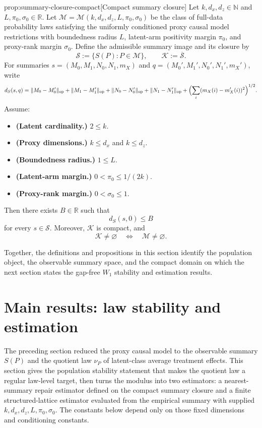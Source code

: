 \documentclass[11pt]{article}
\begin{document}
\begin{propositionv}{prop:summary-closure-compact}[Compact summary closure]
Let \(k,d_x,d_z\in\mathbb N\) and \(L,\pi_0,\sigma_0\in\mathbb R\). Let \(\mathcal M=\mathcal M(k,d_x,d_z,L,\pi_0,\sigma_0)\) be the class of full-data probability laws satisfying the uniformly conditioned proxy causal model restrictions with boundedness radius \(L\), latent-arm positivity margin \(\pi_0\), and proxy-rank margin \(\sigma_0\). Define the admissible summary image and its closure by
\[
\mathscr S:=\{S(P):P\in\mathcal M\},
\qquad
\mathcal K:=\overline{\mathscr S}.
\]
For summaries \(s=(M_0,M_1,N_0,N_1,m_X)\) and \(q=(M_0',M_1',N_0',N_1',m_X')\), write
\[
d_S(s,q)
=
\|M_0-M_0'\|_{\mathrm{op}}
+\|M_1-M_1'\|_{\mathrm{op}}
+\|N_0-N_0'\|_{\mathrm{op}}
+\|N_1-N_1'\|_{\mathrm{op}}
+\Bigl(\sum_i (m_X(i)-m_X'(i))^2\Bigr)^{1/2}.
\]
Assume:
\begin{itemize}
\item \textbf{(Latent cardinality.)} \(2\le k\).
\item \textbf{(Proxy dimensions.)} \(k\le d_x\) and \(k\le d_z\).
\item \textbf{(Boundedness radius.)} \(1\le L\).
\item \textbf{(Latent-arm margin.)} \(0<\pi_0\le 1/(2k)\).
\item \textbf{(Proxy-rank margin.)} \(0<\sigma_0\le 1\).
\end{itemize}
Then there exists \(B\in\mathbb R\) such that
\[
d_S(s,0)\le B
\]
for every \(s\in\mathscr S\). Moreover, \(\mathcal K\) is compact, and
\[
\mathcal K\ne\varnothing
\quad\Longleftrightarrow\quad
\mathcal M\ne\varnothing .
\]
\end{propositionv}

Together, the definitions and propositions in this section identify the population object, the observable summary space, and the compact domain on which the next section states the gap-free \(W_1\) stability and estimation results.


\section{Main results: law stability and estimation}

The preceding section reduced the proxy causal model to the observable summary \(S(P)\) and the quotient law \(\nu_P\) of latent-class average treatment effects. This section gives the population stability statement that makes the quotient law a regular law-level target, then turns the modulus into two estimators: a nearest-summary repair estimator defined on the compact summary closure and a finite structured-lattice estimator evaluated from the empirical summary with supplied \(k,d_x,d_z,L,\pi_0,\sigma_0\). The constants below depend only on those fixed dimensions and conditioning constants.
\end{document}
